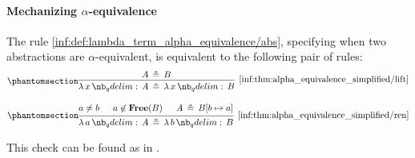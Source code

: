 \paragraph{Mechanizing \( \alpha \)-equivalence}

\begin{proposition}\label{thm:alpha_equivalence_simplified}
  The rule \ref{inf:def:lambda_term_alpha_equivalence/abs}, specifying when two abstractions are \( \alpha \)-equivalent, is equivalent to the following pair of rules:
  \begin{equation*}\taglabel[\ensuremath{ \logic{Lift}_\alpha }]{inf:thm:alpha_equivalence_simplified/lift}
    \begin{prooftree}
      \hypo{ A \aequiv B }
      \infer1[\ref{inf:thm:alpha_equivalence_simplified/lift}]{ \qabs x A \aequiv \qabs x B }
    \end{prooftree}
  \end{equation*}

  \begin{equation*}\taglabel[\ensuremath{ \logic{Ren}_\alpha }]{inf:thm:alpha_equivalence_simplified/ren}
    \begin{prooftree}
      \hypo{ a \neq b }
      \hypo{ a \not\in \op*{Free}(B) }
      \hypo{ A \aequiv B[b \mapsto a] }
      \infer3[\ref{inf:thm:alpha_equivalence_simplified/ren}]{ \qabs a A \aequiv \qabs b B }
    \end{prooftree}
  \end{equation*}
\end{proposition}
\begin{comments}
  \item This check can be found as  in \cite{notebook:code}.
\end{comments}
